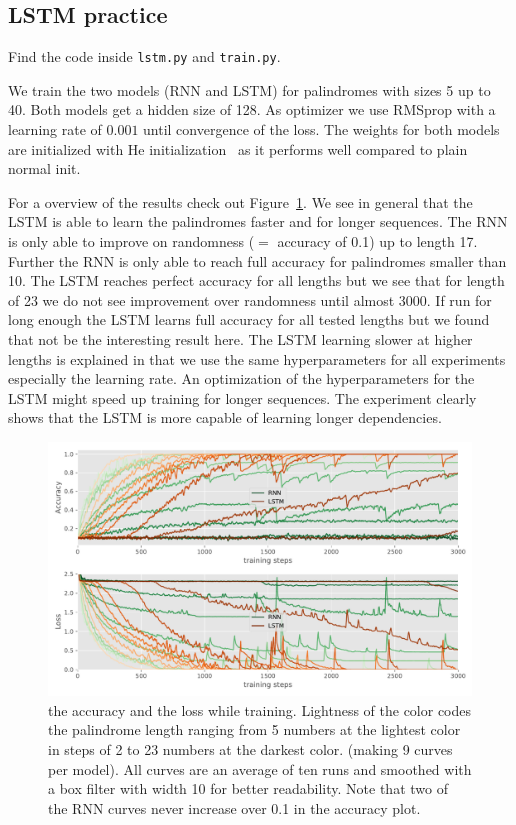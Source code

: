 \documentclass{article}
\begin{document}
\subsection{LSTM practice}\label{sub:lstm_practice}
Find the code inside \texttt{lstm.py} and \texttt{train.py}.

We train the two models (RNN and LSTM) for palindromes with sizes 5 up to 40.
Both models get a hidden size of 128.
As optimizer we use  RMSprop with a learning rate of \(0.001\) until convergence of the loss.
The weights for both models are initialized with He initialization~\cite{he2015} as it performs well compared to plain normal init.

For a overview of the results check out Figure~\ref{fig:accuracy_loss}.
We see in general that the LSTM is able to learn the palindromes faster and for longer sequences.
The RNN is only able to improve on randomness (\(=\) accuracy of 0.1) up to length 17.
Further the RNN is only able to reach full accuracy for palindromes smaller than 10.
The LSTM reaches perfect accuracy for all lengths but we see that for length of 23 we do not see improvement over randomness until almost 3000.
If run for long enough the LSTM learns full accuracy for all tested lengths but we found that not be the interesting result here.
The LSTM learning slower at higher lengths is explained in that we use the same hyperparameters for all experiments especially the learning rate.
An optimization of the hyperparameters for the LSTM might speed up training for longer sequences.
The experiment clearly shows that the LSTM is more capable of learning longer dependencies.

\begin{figure}
  \centering
  \includegraphics[width=\linewidth]{assignment_2/part1/palindrome.pdf}
  \caption{ the accuracy and  the loss while training.
  Lightness of the color codes the palindrome length ranging from 5 numbers at the lightest color in steps of 2 to 23 numbers at the darkest color.
  (making 9 curves per model). All curves are an average of ten runs and smoothed with a box filter with width 10 for better readability. Note that two of the RNN curves never increase over 0.1 in the accuracy plot.}\label{fig:accuracy_loss}
\end{figure}
\end{document}
